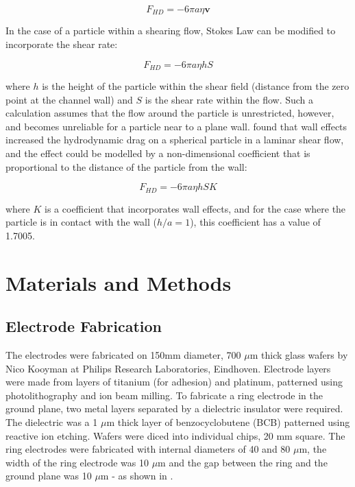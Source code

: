 \begin{equation}
F_{HD}= -6 \pi a \eta \textbf{v}
 \label{eqn:stokes_law}
\end{equation}

In the case of a particle within a shearing flow, Stokes Law can be modified to incorporate the shear rate:

\begin{equation}
F_{HD}= -6 \pi a \eta h S
 \label{eqn:stokes_law_shearing_flow}
\end{equation}

where $h$ is the height of the particle within the shear field (distance from the zero point at the channel wall) and $S$ is the shear rate within the flow. Such a calculation assumes that the flow around the particle is unrestricted, however, and becomes unreliable for a particle near to a plane wall. \cite{Goldman:1967} found that wall effects increased the hydrodynamic drag on a spherical particle in a laminar shear flow, and the effect could be modelled by a non-dimensional coefficient that is proportional to the distance of the particle from the wall:

\begin{equation}
F_{HD}= -6 \pi a \eta h S K
 \label{eqn:stokes_law_goldman_correction}
\end{equation}

where $K$ is a coefficient that incorporates wall effects, and for the case where the particle is in contact with the wall ($h/a = 1$), this coefficient has a value of 1.7005.

\section{Materials and Methods}

\subsection{Electrode Fabrication}
The electrodes were fabricated on 150mm diameter, 700 $\mu$m thick glass wafers by Nico Kooyman at Philips Research Laboratories, Eindhoven. Electrode layers were made from layers of titanium (for adhesion) and platinum, patterned using photolithography and ion beam milling. To fabricate a ring electrode in the ground plane, two metal layers separated by a dielectric insulator were required.  The dielectric was a 1 $\mu$m thick layer of benzocyclobutene (BCB) patterned using reactive ion etching. Wafers were diced into individual chips, 20 mm square.  The ring electrodes were fabricated with internal diameters of 40 and 80 $\mu$m, the width of the ring electrode was 10 $\mu$m and the gap between the ring and the ground plane was 10 $\mu$m - as shown in .


